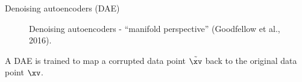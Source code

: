 \begin{vbframe}{Denoising autoencoders (DAE)}
\framebreak
  \begin{figure}
    \centering
    \caption{Denoising autoencoders - \enquote{manifold perspective} (Goodfellow et al., 2016).}
  \end{figure}
    A DAE is trained to map a corrupted data point $\tilde{\xv}$ back to
the original data point $\xv$.
  \framebreak
\begin{figure}
    \centering

\end{figure}
\end{vbframe}
